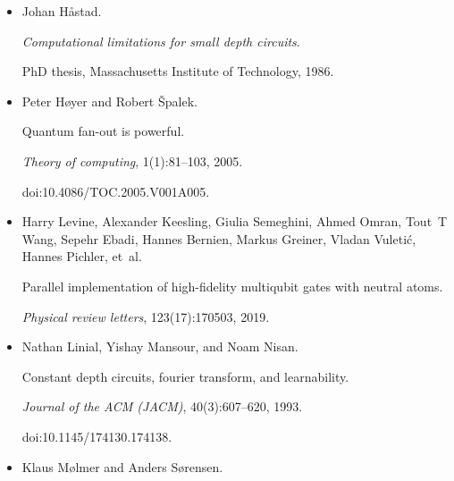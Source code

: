 \documentclass[10pt,a4paper]{article}
\begin{document}
\begin{itemize}
Jonas Haferkamp, Dominik Hangleiter, Adam Bouland, Bill Fefferman, Jens Eisert,
and Juani Bermejo-Vega.


Closing gaps of a quantum advantage with short-time hamiltonian
dynamics.


\emph{Physical Review Letters}, 125(25):250501, 2020.





\item[] 
[12]

Johan Håstad.


\emph{Computational limitations for small depth circuits}.


PhD thesis, Massachusetts Institute of Technology, 1986.





\item[] 
[13]

Peter Høyer and Robert Špalek.


Quantum fan-out is powerful.


\emph{Theory of computing}, 1(1):81–103, 2005.


doi:10.4086/TOC.2005.V001A005.





\item[] 
[14]

Harry Levine, Alexander Keesling, Giulia Semeghini, Ahmed Omran, Tout T Wang,
Sepehr Ebadi, Hannes Bernien, Markus Greiner, Vladan Vuletić, Hannes
Pichler, et al.


Parallel implementation of high-fidelity multiqubit gates with
neutral atoms.


\emph{Physical review letters}, 123(17):170503, 2019.





\item[] 
[15]

Nathan Linial, Yishay Mansour, and Noam Nisan.


Constant depth circuits, fourier transform, and learnability.


\emph{Journal of the ACM (JACM)}, 40(3):607–620, 1993.


doi:10.1145/174130.174138.





\item[] 
[16]

Klaus Mølmer and Anders Sørensen.



\end{itemize}
\end{document}
